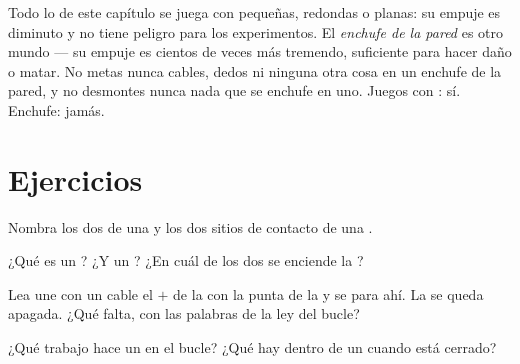 \begin{remark}\label{rem:g3:first-electric-circuit:safety}
Todo lo de este capítulo se juega con  pequeñas, redondas o
planas: su empuje es diminuto y no tiene peligro para los
experimentos. El \emph{enchufe de la pared} es otro mundo --- su
empuje es cientos de veces más tremendo, suficiente para hacer daño o
matar. No metas nunca cables, dedos ni ninguna otra cosa en un enchufe
de la pared, y no desmontes nunca nada que se enchufe en uno. Juegos
con : sí. Enchufe: jamás.
\end{remark}

\section{Ejercicios}

\begin{exercise}[$\star$]\label{exo:g3:first-electric-circuit:1}
Nombra los dos  de una  y los dos sitios de contacto de
una .
\end{exercise}

\begin{exercise}[$\star$]\label{exo:g3:first-electric-circuit:2}
¿Qué es un ? ¿Y un ? ¿En cuál de
los dos se enciende la ?
\end{exercise}

\begin{exercise}[$\star$]\label{exo:g3:first-electric-circuit:3}
Lea une con un cable el  $+$ de la  con la punta de la
 y se para ahí. La  se queda apagada. ¿Qué falta,
con las palabras de la ley del bucle?
\end{exercise}

\begin{exercise}[$\star$]\label{exo:g3:first-electric-circuit:4}
¿Qué trabajo hace un  en el bucle? ¿Qué hay dentro de un
 cuando está cerrado?
\end{exercise}

